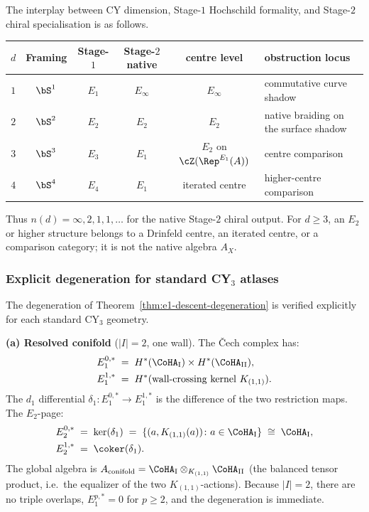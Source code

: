 \begin{remark}
\label{rem:descent-hierarchy}
The interplay between CY dimension, Stage-$1$ Hochschild formality, and
Stage-$2$ chiral specialisation is as follows.
\begin{center}
\renewcommand{\arraystretch}{1.3}
\small
\begin{tabular}{cccccl}
 \toprule
 $d$ & Framing & Stage-$1$ & Stage-$2$ native & centre level & obstruction locus \\
 \midrule
 $1$ & $\bS^1$ & $E_1$ & $E_\infty$ & $E_\infty$ & commutative curve shadow \\
 $2$ & $\bS^2$ & $E_2$ & $E_2$ & $E_2$ & native braiding on the surface shadow \\
 $3$ & $\bS^3$ & $E_3$ & $E_1$ & $E_2$ on $\cZ(\Rep^{E_1}(A))$ & centre comparison \\
 $4$ & $\bS^4$ & $E_4$ & $E_1$ & iterated centre & higher-centre comparison \\
 \bottomrule
\end{tabular}
\end{center}
Thus \(n(d)=\infty,2,1,1,\ldots\) for the native Stage-$2$ chiral
output.  For \(d\ge3\), an \(E_2\) or higher structure belongs to a
Drinfeld centre, an iterated centre, or a comparison category; it is not
the native algebra \(A_X\).
\end{remark}

\subsubsection{Explicit degeneration for standard CY\texorpdfstring{$_3$}{-3} atlases}
\label{subsubsec:degeneration-examples}

The degeneration of Theorem~\ref{thm:e1-descent-degeneration} is verified explicitly for each standard CY$_3$ geometry.

\medskip
\noindent\textbf{(a) Resolved conifold} ($|I| = 2$, one wall). The \v{C}ech complex has:
\begin{align*}
 E_1^{0,*} &\;=\; H^*(\CoHA_{\mathrm{I}}) \times H^*(\CoHA_{\mathrm{II}}), \\
 E_1^{1,*} &\;=\; H^*(\text{wall-crossing kernel } K_{(1,1)}).
\end{align*}
The $d_1$ differential $\delta_1 \colon E_1^{0,*} \to E_1^{1,*}$ is the difference of the two restriction maps. The $E_2$-page:
\begin{align*}
 E_2^{0,*} &\;=\; \ker(\delta_1) \;=\; \{(a, K_{(1,1)}(a)) \colon a \in \CoHA_{\mathrm{I}}\} \;\cong\; \CoHA_{\mathrm{I}}, \\
 E_2^{1,*} &\;=\; \coker(\delta_1).
\end{align*}
The global algebra is $A_{\text{conifold}} = \CoHA_{\mathrm{I}} \otimes_{K_{(1,1)}} \CoHA_{\mathrm{II}}$ (the balanced tensor product, i.e.\ the equalizer of the two $K_{(1,1)}$-actions). Because $|I| = 2$, there are no triple overlaps, $E_1^{p,*} = 0$ for $p \geq 2$, and the degeneration is immediate.


